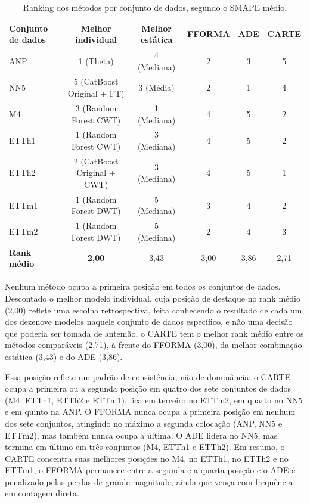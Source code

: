 \begin{table}[H]
\centering
\caption{Ranking dos métodos por conjunto de dados, segundo o SMAPE médio.}
\label{tab:sintese-ranking}
\footnotesize
\begin{tabular}{@{}lccccc@{}}
\toprule
\textbf{Conjunto de dados} & \textbf{Melhor individual} & \textbf{Melhor estática} & \textbf{FFORMA} & \textbf{ADE} & \textbf{CARTE} \\
\midrule
ANP    & 1 (Theta)                       & 4 (Mediana) & 2 & 3 & 5 \\
NN5    & 5 (CatBoost Original + FT)      & 3 (Média)   & 2 & 1 & 4 \\
M4     & 3 (Random Forest CWT)           & 1 (Mediana) & 4 & 5 & 2 \\
ETTh1  & 1 (Random Forest CWT)           & 3 (Mediana) & 4 & 5 & 2 \\
ETTh2  & 2 (CatBoost Original + CWT)     & 3 (Mediana) & 4 & 5 & 1 \\
ETTm1  & 1 (Random Forest DWT)           & 5 (Mediana) & 3 & 4 & 2 \\
ETTm2  & 1 (Random Forest DWT)           & 5 (Mediana) & 2 & 4 & 3 \\
\midrule
\textbf{Rank médio} & \textbf{2,00} & 3,43 & 3,00 & 3,86 & 2,71 \\
\bottomrule
\end{tabular}
\end{table}

Nenhum método ocupa a primeira posição em todos os conjuntos de dados. Descontado o melhor modelo individual, cuja posição de destaque no rank médio (2,00) reflete uma escolha retrospectiva, feita conhecendo o resultado de cada um dos dezenove modelos naquele conjunto de dados específico, e não uma decisão que poderia ser tomada de antemão, o CARTE tem o melhor rank médio entre os métodos comparáveis (2,71), à frente do FFORMA (3,00), da melhor combinação estática (3,43) e do ADE (3,86).

Essa posição reflete um padrão de consistência, não de dominância: o CARTE ocupa a primeira ou a segunda posição em quatro dos sete conjuntos de dados (M4, ETTh1, ETTh2 e ETTm1), fica em terceiro no ETTm2, em quarto no NN5 e em quinto na ANP. O FFORMA nunca ocupa a primeira posição em nenhum dos sete conjuntos, atingindo no máximo a segunda colocação (ANP, NN5 e ETTm2), mas também nunca ocupa a última. O ADE lidera no NN5, mas termina em último em três conjuntos (M4, ETTh1 e ETTh2). Em resumo, o CARTE concentra suas melhores posições no M4, no ETTh1, no ETTh2 e no ETTm1, o FFORMA permanece entre a segunda e a quarta posição e o ADE é penalizado pelas perdas de grande magnitude, ainda que vença com frequência em contagem direta.

